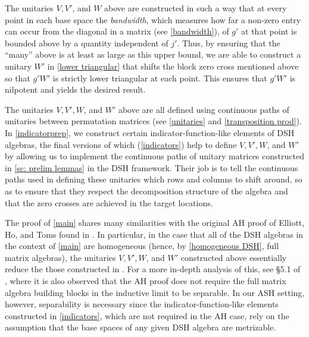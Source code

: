 \documentclass[12pt]{amsart}
\numberwithin{equation}{section}
\theoremstyle{definition}
\theoremstyle{remark}
\begin{document}
The unitaries $V,V'$, and $W$ above are constructed in such a way that at every point in each base space the \textit{bandwidth}, which measures how far a non-zero entry can occur from the diagonal in a matrix (see \autoref{bandwidth}), of $g'$ at that point is bounded above by a quantity independent of $j'$. Thus, by ensuring that the ``many'' above is at least as large as this upper bound, we are able to construct a unitary $W'$ in \autoref{lower triangular} that shifts the block zero cross mentioned above so that $g'W'$ is strictly lower triangular at each point. This ensures that $g'W'$ is nilpotent and yields the desired result. 

The unitaries $V,V',W$, and $W'$ above are all defined using continuous paths of unitaries between permutation matrices (see \autoref{unitaries} and \autoref{transposition prod}). In \autoref{indicatorprep}, we construct certain indicator-function-like elements of DSH algebras, the final versions of which (\autoref{indicators}) help to define $V,V',W$, and $W'$ by allowing us to implement the continuous paths of unitary matrices constructed in \cref{sc: prelim lemmas} in the DSH framework. Their job is to tell the continuous paths used in defining these unitaries which rows and columns to shift around, so as to ensure that they respect the decomposition structure of the algebra and that the zero crosses are achieved in the target locations.

The proof of \autoref{main} shares many similarities with the original AH proof of Elliott, Ho, and Toms found in \cite{EHT}. In particular, in the case that all of the DSH algebras in the context of \autoref{main} are homogeneous (hence, by \autoref{homogeneous DSH}, full matrix algebras), the unitaries $V,V',W$, and $W'$ constructed above essentially reduce the those constructed in \cite{EHT}. For a more in-depth analysis of this, see \S 5.1 of \cite{alb}, where it is also observed that the AH proof does not require the full matrix algebra building blocks in the inductive limit to be separable. In our ASH setting, however, separability is necessary since the indicator-function-like elements constructed in \autoref{indicators}, which are not required in the AH case, rely on the assumption that the base spaces of any given DSH algebra are metrizable.
\end{document}
